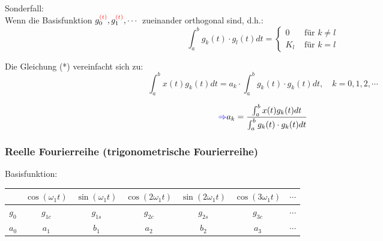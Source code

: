
Sonderfall:\\
Wenn die Basisfunktion $g_0^{\textcolor{red}{(t)}},g_1^{\textcolor{red}{(t)}},\cdots$ zueinander orthogonal sind, d.h.:\\
\begin{equation}
    \int_{a}^{b} g_{k}(t) \cdot g_{l}(t) d t= \begin{cases}0 & \text { für } k \neq l \\ K_{l} & \text { für } k=l\end{cases}
\end{equation}

Die Gleichung (*) vereinfacht sich zu:\\
\begin{equation}
    \int_{a}^{b} x(t) g_{k}(t) d t=a_{k} \cdot \int_{a}^{b} g_{k}(t) \cdot g_{k}(t) d t, \quad k=0,1,2, \cdots
\end{equation}

\begin{equation}
    \textcolor{blue}{\Rightarrow} a_{k}=\frac{\int_{a}^{b} x(t) g_{k}(t) d t}{\int_{a}^{b} g_{k}(t) \cdot g_{k}(t) d t}
\end{equation}


\subsubsection{\textbf{Reelle Fourierreihe (trigonometrische Fourierreihe)}}
Basisfunktion:\par
\begin{center}
    \begin{tabular}{c|c|c|c|c|c|c}
    \hline
    \centering
    1 & $\cos(\omega_1 t)$ & $\sin(\omega_1 t)$ & $\cos(2 \omega_1 t)$ & $\sin(2 \omega_1 t)$ & $\cos(3 \omega_1 t)$ & $\cdots$\\
    \hline
    $g_0$ & $g_{1c}$ & $g_{1s}$ & $g_{2c}$ & $g_{2s}$ & $g_{3c}$ & $\cdots$ \\
    $a_0$ & $a_1$ & $b_1$ & $a_2$ & $b_2$ & $a_3$ & $\cdots$ \\
    \hline
    \end{tabular}
\end{center}


